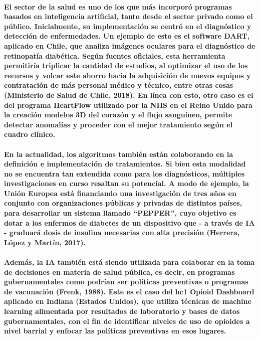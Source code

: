 \documentclass[a4paper,12pt]{article}
\begin{document}
\paragraph{El sector de la salud es uno de los que más incorporó programas basados en inteligencia artificial, tanto desde el sector privado como el público. Inicialmente, su implementación se centró en el diagnóstico y detección de enfermedades. Un ejemplo de esto es el software DART, aplicado en Chile, que analiza imágenes oculares para el diagnóstico de retinopatía diabética. Según fuentes oficiales, esta herramienta permitiría triplicar la cantidad de estudios, al optimizar el uso de los recursos y volcar este ahorro hacia la adquisición de nuevos equipos y contratación de más personal médico y técnico, entre otras cosas (Ministerio de Salud de Chile, 2018). En línea con esto, otro caso es el del programa HeartFlow utilizado por la NHS en el Reino Unido para la creación modelos 3D del corazón y el flujo sanguíneo, permite detectar anomalías y proceder con el mejor tratamiento según el cuadro clínico.}
\paragraph{En la actualidad, los algoritmos también están colaborando en la definición e implementación de tratamientos. Si bien esta modalidad no se encuentra tan extendida como para los diagnósticos, múltiples investigaciones en curso resaltan su potencial. A modo de ejemplo, la Unión Europea está financiando una investigación de tres años en conjunto con organizaciones públicas y privadas de distintos países, para desarrollar un sistema llamado “PEPPER”, cuyo objetivo es dotar a los enfermos de diabetes de un dispositivo que - a través de IA - graduará dosis de insulina necesarias con alta precisión (Herrera, López y Martín, 2017).}
\paragraph{Además, la IA también está siendo utilizada para colaborar en la toma de decisiones en materia de salud pública, es decir, en programas gubernamentales como podrían ser políticas preventivas o programas de vacunación (Frenk, 1988). Este es el caso del hc1 Opioid Dashboard aplicado en Indiana (Estados Unidos), que utiliza técnicas de machine learning alimentada por resultados de laboratorio y bases de datos gubernamentales, con el fin de identificar niveles de uso de opioides a nivel barrial y enfocar las políticas preventivas en esos lugares.}
\end{document}
